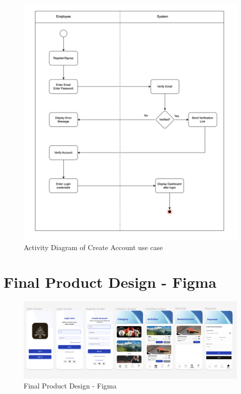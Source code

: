 \begin{figure}[h!t]
    \centering
    \includegraphics[width=\textwidth]{images/activityCreateAccount.png}
    \caption{Activity Diagram of Create Account use case}
    \label{fig:activityCreateAccount}
\end{figure}

\FloatBarrier

\section{Final Product Design - Figma}

\begin{figure}[h!t]
    \centering
    \includegraphics[width=\textwidth]{images/Design.png}
    \caption{Final Product Design - Figma}
    \label{fig:finalproductdesign}
\end{figure}



\FloatBarrier
\newpage